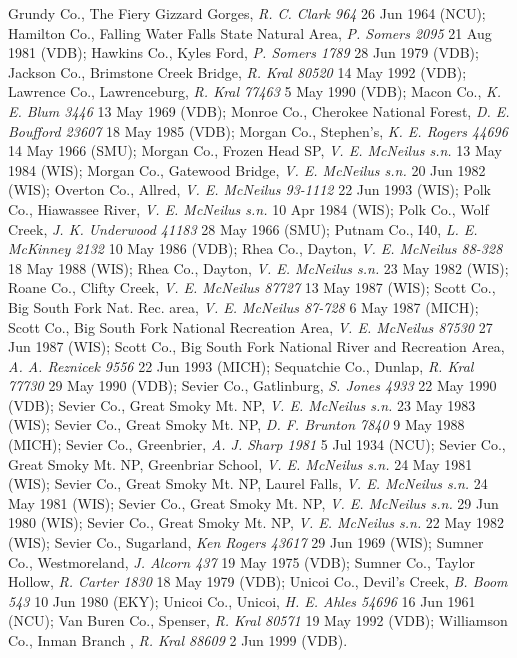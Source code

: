 \documentclass{article}
\begin{document}
Grundy Co., The Fiery Gizzard Gorges, \textit{R. C. Clark 964} 26 Jun 1964 (NCU);
Hamilton Co., Falling Water Falls State Natural Area, \textit{P. Somers 2095} 21 Aug 1981 (VDB);
Hawkins Co., Kyles Ford, \textit{P. Somers 1789} 28 Jun 1979 (VDB);
Jackson Co., Brimstone Creek Bridge, \textit{R. Kral 80520} 14 May 1992 (VDB);
Lawrence Co., Lawrenceburg, \textit{R. Kral 77463} 5 May 1990 (VDB);
Macon Co., \textit{K. E. Blum 3446} 13 May 1969 (VDB);
Monroe Co., Cherokee National Forest, \textit{D. E. Boufford 23607} 18 May 1985 (VDB);
Morgan Co., Stephen's, \textit{K. E. Rogers 44696} 14 May 1966 (SMU);
Morgan Co., Frozen Head SP, \textit{V. E. McNeilus s.n.} 13 May 1984 (WIS);
Morgan Co., Gatewood Bridge, \textit{V. E. McNeilus s.n.} 20 Jun 1982 (WIS);
Overton Co., Allred, \textit{V. E. McNeilus 93-1112} 22 Jun 1993 (WIS);
Polk Co., Hiawassee River, \textit{V. E. McNeilus s.n.} 10 Apr 1984 (WIS);
Polk Co., Wolf Creek, \textit{J. K. Underwood 41183} 28 May 1966 (SMU);
Putnam Co., I40, \textit{L. E. McKinney 2132} 10 May 1986 (VDB);
Rhea Co., Dayton, \textit{V. E. McNeilus 88-328} 18 May 1988 (WIS);
Rhea Co., Dayton, \textit{V. E. McNeilus s.n.} 23 May 1982 (WIS);
Roane Co., Clifty Creek, \textit{V. E. McNeilus 87727} 13 May 1987 (WIS);
Scott Co., Big South Fork Nat. Rec. area, \textit{V. E. McNeilus 87-728} 6 May 1987 (MICH);
Scott Co., Big South Fork National Recreation Area, \textit{V. E. McNeilus 87530} 27 Jun 1987 (WIS);
Scott Co., Big South Fork National River and Recreation Area, \textit{A. A. Reznicek 9556} 22 Jun 1993 (MICH);
Sequatchie Co., Dunlap, \textit{R. Kral 77730} 29 May 1990 (VDB);
Sevier Co., Gatlinburg, \textit{S. Jones 4933} 22 May 1990 (VDB);
Sevier Co., Great Smoky Mt. NP, \textit{V. E. McNeilus s.n.} 23 May 1983 (WIS);
Sevier Co., Great Smoky Mt. NP, \textit{D. F. Brunton 7840} 9 May 1988 (MICH);
Sevier Co., Greenbrier, \textit{A. J. Sharp 1981} 5 Jul 1934 (NCU);
Sevier Co., Great Smoky Mt. NP, Greenbriar School, \textit{V. E. McNeilus s.n.} 24 May 1981 (WIS);
Sevier Co., Great Smoky Mt. NP, Laurel Falls, \textit{V. E. McNeilus s.n.} 24 May 1981 (WIS);
Sevier Co., Great Smoky Mt. NP, \textit{V. E. McNeilus s.n.} 29 Jun 1980 (WIS);
Sevier Co., Great Smoky Mt. NP, \textit{V. E. McNeilus s.n.} 22 May 1982 (WIS);
Sevier Co., Sugarland, \textit{Ken Rogers 43617} 29 Jun 1969 (WIS);
Sumner Co., Westmoreland, \textit{J. Alcorn 437} 19 May 1975 (VDB);
Sumner Co., Taylor Hollow, \textit{R. Carter 1830} 18 May 1979 (VDB);
Unicoi Co., Devil's Creek, \textit{B. Boom 543} 10 Jun 1980 (EKY);
Unicoi Co., Unicoi, \textit{H. E. Ahles 54696} 16 Jun 1961 (NCU);
Van Buren Co., Spenser, \textit{R. Kral 80571} 19 May 1992 (VDB);
Williamson Co., Inman Branch , \textit{R. Kral 88609} 2 Jun 1999 (VDB).
\end{document}

